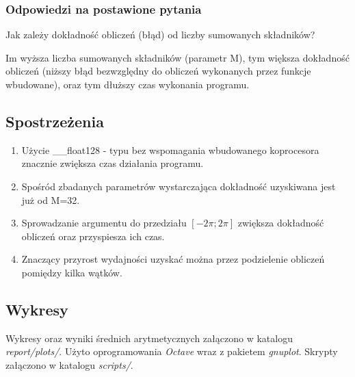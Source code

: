 \documentclass[12pt]{article}
\newenvironment{question}[2][Pytanie]{\begin{trivlist}
\item[\hskip \labelsep {\bfseries #1}\hskip \labelsep {\bfseries #2.}]}{\end{trivlist}}
\begin{document}
\subsubsection{Odpowiedzi na postawione pytania}
\begin{question}{1}
Jak zależy dokładność obliczeń (błąd) od liczby sumowanych składników?
\end{question}
Im wyższa liczba sumowanych składników (parametr M), tym większa dokładność obliczeń (niższy błąd bezwzględny do obliczeń wykonanych przez funkcje wbudowane), oraz tym dłuższy czas wykonania programu.

\subsection{Spostrzeżenia}
\begin{enumerate}
    \item Użycie \_\_float128 - typu bez wspomagania wbudowanego koprocesora znacznie zwiększa czas działania programu.
    \item Spośród zbadanych parametrów wystarczająca dokładność uzyskiwana jest już od M=32.
    \item Sprowadzanie argumentu do przedziału $[-2\pi;2\pi]$ zwiększa dokładność obliczeń oraz przyspiesza ich czas.
    \item Znaczący przyrost wydajności uzyskać można przez podzielenie obliczeń pomiędzy kilka wątków.
\end{enumerate}

\subsection{Wykresy}
Wykresy oraz wyniki średnich arytmetycznych załączono w katalogu \textit{report/plots/}.
Użyto oprogramowania \textit{Octave} wraz z pakietem \textit{gnuplot}. Skrypty załączono w katalogu \textit{scripts/}.
\end{document}
